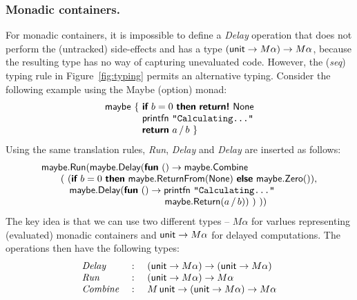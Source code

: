\documentclass[runningheads,a4paper]{llncs}
\begin{document}
\vspace{-1em}
\subsubsection{Monadic containers.} For monadic containers, it is impossible to define
a \emph{Delay} operation that does not perform the (untracked) side-effects and has a type $(\textnormal{\sffamily unit} \rightarrow M\alpha) \rightarrow M\alpha$,
because the resulting type has no way of capturing unevaluated code. However, the (\emph{seq}) typing 
rule in Figure~\ref{fig:typing} permits an alternative typing. Consider the following example using 
the Maybe (option) monad:
%
\begin{equation*}
\begin{array}{l}
\ident{maybe}~\{~\kvd{if}~b=0~\kvd{then}~\kvd{return!}~\ident{None}\\
\hspace{3.85em}  \ident{printfn}~\texttt{"Calculating..."}\\
\hspace{3.85em}  \kvd{return}~a\,/\,b~\}\\
\end{array}
\end{equation*}
%
Using the same translation rules, \emph{Run}, \emph{Delay} and \emph{Delay} are inserted as follows:
%
\begin{equation*}
\begin{array}{l}
\ident{maybe}.\ident{Run}(\ident{maybe}.\ident{Delay}(\kvd{fun}~()\rightarrow \ident{maybe}.\ident{Combine}\\
\quad\quad (~(\kvd{if}~b=0~\kvd{then}~\ident{maybe}.\ident{ReturnFrom}(\ident{None})~
    \kvd{else}~\ident{maybe}.\ident{Zero}()), \\
\hspace{2.9em} \ident{maybe}.\ident{Delay}(\kvd{fun}~()\rightarrow \ident{printfn}~\texttt{"Calculating..."}\\
\hspace{12.8em}     \ident{maybe}.\ident{Return}(a\,/\,b))~)~))
\end{array}
\end{equation*}
%
The key idea is that we can use two different types -- $M\alpha$ for varlues representing
(evaluated) monadic containers and $\textnormal{\sffamily unit} \rightarrow M\alpha$ for delayed computations. The 
operations then have the following types:
%
\begin{equation*}
\begin{array}{lcl}
\emph{Delay}   &~:~& (\textnormal{\sffamily unit} \rightarrow M\alpha) \rightarrow (\textnormal{\sffamily unit} \rightarrow M\alpha)\\
\emph{Run}     &~:~& (\textnormal{\sffamily unit} \rightarrow M\alpha) \rightarrow M\alpha\\
\emph{Combine} &~:~& M\,\textnormal{\sffamily unit} \rightarrow (\textnormal{\sffamily unit} \rightarrow M\alpha) \rightarrow M\alpha
\end{array}
\end{equation*}
\end{document}
